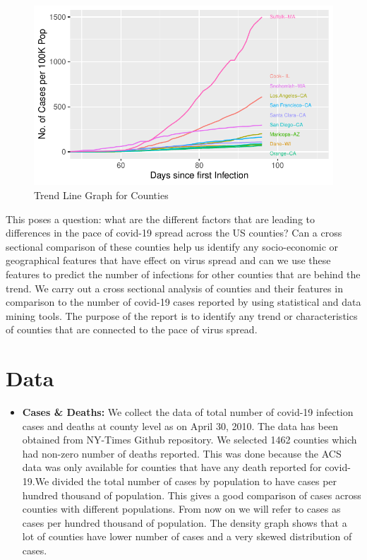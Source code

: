\documentclass[
]{article}
\providecommand{\tightlist}{%
  \setlength{\itemsep}{0pt}\setlength{\parskip}{0pt}}
\begin{document}
\begin{figure}
\centering
\includegraphics{Final-Project-Covid-19_files/figure-latex/unnamed-chunk-2-1.pdf}
\caption{Trend Line Graph for Counties}
\end{figure}

This poses a question: what are the different factors that are leading
to differences in the pace of covid-19 spread across the US counties?
Can a cross sectional comparison of these counties help us identify any
socio-economic or geographical features that have effect on virus spread
and can we use these features to predict the number of infections for
other counties that are behind the trend. We carry out a cross sectional
analysis of counties and their features in comparison to the number of
covid-19 cases reported by using statistical and data mining tools. The
purpose of the report is to identify any trend or characteristics of
counties that are connected to the pace of virus spread.

\hypertarget{data}{%
\section{Data}\label{data}}

\begin{itemize}
\tightlist
\item
  \textbf{Cases \& Deaths:} We collect the data of total number of
  covid-19 infection cases and deaths at county level as on April 30,
  2010. The data has been obtained from NY-Times Github repository. We
  selected 1462 counties which had non-zero number of deaths reported.
  This was done because the ACS data was only available for counties
  that have any death reported for covid-19.We divided the total number
  of cases by population to have cases per hundred thousand of
  population. This gives a good comparison of cases across counties with
  different populations. From now on we will refer to cases as cases per
  hundred thousand of population. The density graph shows that a lot of
  counties have lower number of cases and a very skewed distribution of
  cases.
\end{itemize}
\end{document}
